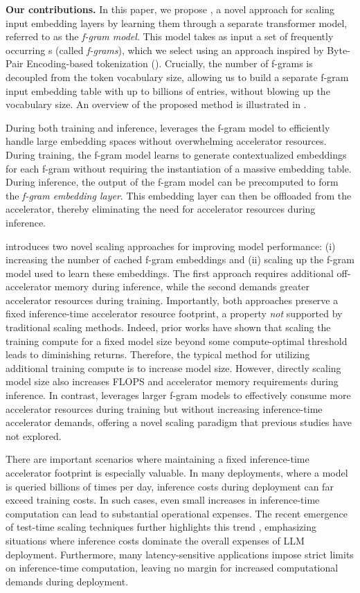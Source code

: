\noindent\textbf{Our contributions.} In this paper, we propose \SCONE, a novel approach for scaling input embedding layers by learning them through a separate transformer model, referred to as the \emph{f-gram model}. This model takes as input a set of frequently occurring s (called \emph{f-grams}), which we select using an approach inspired by Byte-Pair Encoding-based tokenization (). Crucially, the number of f-grams is decoupled from the token vocabulary size, allowing us to build a separate f-gram input embedding table with up to billions of entries, without blowing up the vocabulary size. An overview of the proposed method is illustrated in .

During both training and inference, \SCONE leverages the f-gram model to efficiently handle large embedding spaces without overwhelming accelerator resources. During training, the f-gram model learns to generate contextualized embeddings for each f-gram without requiring the instantiation of a massive embedding table.  During inference, the output of the f-gram model can be precomputed to form the \emph{f-gram embedding layer}. This embedding layer can then be offloaded from the accelerator, thereby eliminating the need for accelerator resources during inference.

\SCONE introduces two novel scaling approaches for improving model performance: (i) increasing the number of cached f-gram embeddings and (ii) scaling up the f-gram model used to learn these embeddings. The first approach requires additional off-accelerator memory during inference, while the second demands greater accelerator resources during training. Importantly, both approaches preserve a fixed inference-time accelerator resource footprint, a property \emph{not}  supported by traditional scaling methods. Indeed, prior works \citep{jones2021scaling, hoffmann2022training} have shown that scaling the training compute for a fixed model size beyond some compute-optimal threshold leads to diminishing returns. Therefore, the typical method for utilizing additional training compute is to increase model size. However, directly scaling model size also increases FLOPS and accelerator memory requirements during inference. In contrast, \SCONE leverages larger f-gram models to effectively consume more accelerator resources during training but without increasing inference-time accelerator demands, offering a novel scaling paradigm that previous studies have not explored. 

There are important scenarios where maintaining a fixed inference-time accelerator footprint is especially valuable. In many deployments, where a model is queried billions of times per day, inference costs during deployment can far exceed training costs. In such cases, even small increases in inference-time computation can lead to substantial operational expenses. The recent emergence of test-time scaling techniques further highlights this trend \citep{jones2021scaling, snell2024scaling}, emphasizing situations where inference costs dominate the overall expenses of LLM deployment. Furthermore, many latency-sensitive applications impose strict limits on inference-time computation, leaving no margin for increased computational demands during deployment.

